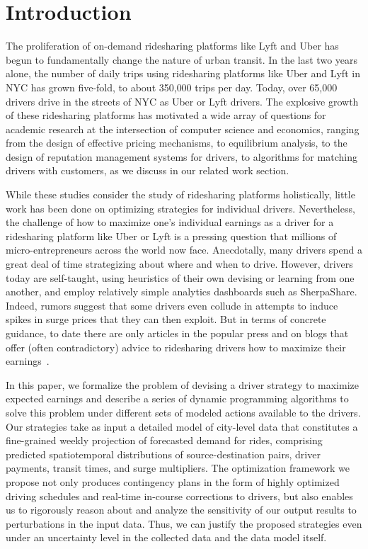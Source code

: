 
\section{Introduction}
\label{sec:introduction}

The proliferation of on-demand ridesharing platforms like Lyft and Uber
  has begun to fundamentally change the nature of urban transit. 
In the last two years alone, the number of daily trips using ridesharing 
  platforms like Uber and Lyft in NYC has grown five-fold, 
  to about 350,000 trips per day. 
Today, over 65,000 drivers drive in the streets of NYC as Uber or Lyft drivers.
The explosive growth of these ridesharing platforms has motivated a wide
  array of questions for academic research at the intersection of computer
  science and economics, ranging from the design of effective pricing mechanisms, 
  to equilibrium analysis, to the design of reputation management systems for 
  drivers, to algorithms for matching drivers with 
  customers, as we discuss in our related work section.

While these studies consider the study of ridesharing platforms holistically, 
   little work has been done on optimizing strategies for individual drivers. 
Nevertheless, the challenge of how to maximize one's individual earnings as a driver for a 
ridesharing platform like Uber or Lyft is a pressing question that millions of micro-entrepreneurs 
across the world now face.  Anecdotally, many drivers spend a great deal of time 
strategizing about where and when to drive.  However, drivers today are 
self-taught, using heuristics of their own devising or learning from one another, 
and employ relatively simple analytics dashboards such as SherpaShare.
Indeed, rumors suggest that some drivers even collude in attempts to induce spikes in surge prices that they can then exploit.
But in terms of concrete guidance, to date there are only articles in the
  popular press and on blogs that offer (often contradictory) advice to ridesharing drivers 
  how to maximize their earnings~\cite{dont,tips,sherpashareNYT}.

In this paper, we formalize the problem of devising a driver strategy to maximize expected 
 earnings and describe a series of dynamic programming algorithms to solve this problem
 under different sets of modeled actions available to the drivers. 
Our strategies take as input a detailed model of city-level data that constitutes a 
  fine-grained weekly projection of forecasted demand for rides, comprising 
  predicted spatiotemporal distributions of source-destination pairs, driver payments,
  transit times, and surge multipliers. 
The optimization framework we propose not only produces contingency plans in the form of
  highly optimized driving schedules and real-time in-course corrections to drivers, but 
  also enables us to rigorously reason about and analyze the sensitivity of our output 
  results to perturbations in the input data.  
Thus, we can justify the proposed strategies even under an uncertainty level in the
  collected data and the data model itself.
  
